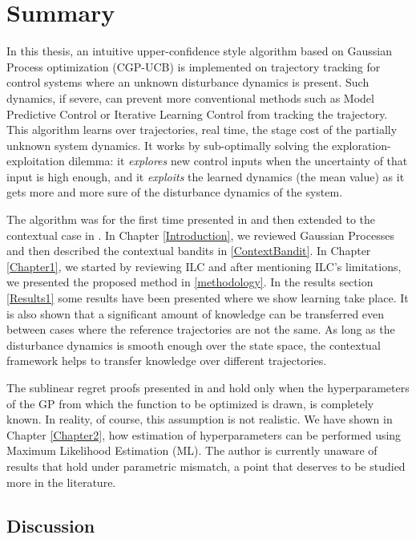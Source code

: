 \chapter{Summary}
\label{s:Summary}

In this thesis, an intuitive upper-confidence style algorithm based on Gaussian Process optimization (CGP-UCB) is implemented on trajectory tracking for control systems where an unknown disturbance dynamics is present. Such dynamics, if severe, can prevent more conventional methods such as Model Predictive Control or Iterative Learning Control from tracking the trajectory. This algorithm learns over trajectories, real time, the stage cost of the partially unknown system dynamics. It works by sub-optimally solving the exploration-exploitation dilemma: it \emph{explores} new control inputs when the uncertainty of that input is high enough, and it \emph{exploits} the learned dynamics (the mean value) as it gets more and more sure of the disturbance dynamics of the system. 

The algorithm was for the first time presented in \cite{Krause1} and then extended to the contextual case in \cite{Krause2}. In Chapter \ref{Introduction}, we reviewed Gaussian Processes and then described the contextual bandits in \ref{ContextBandit}. In Chapter \ref{Chapter1}, we started by reviewing ILC and after mentioning ILC's limitations, we presented the proposed method in \ref{methodology}. In the results section \ref{Results1} some results have been presented where we show learning take place. It is also shown that a significant amount of knowledge can be transferred even between cases where the reference trajectories are not the same. As long as the disturbance dynamics is smooth enough over the state space, the contextual framework helps to transfer knowledge over different trajectories.

The sublinear regret proofs presented in \cite{Krause1} and \cite{Krause2} hold only when the hyperparameters of the GP from which the function to be optimized is drawn, is completely known. In reality, of course, this assumption is not realistic. We have shown in Chapter \ref{Chapter2}, how estimation of hyperparameters can be performed using Maximum Likelihood Estimation (ML). The author is currently unaware of results that hold under parametric mismatch, a point that deserves to be studied more in the literature.

\section{Discussion}

